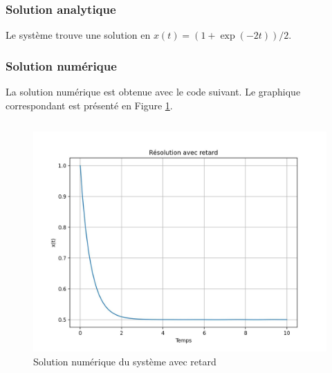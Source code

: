             \subsubsection{Solution analytique}
                Le système trouve une solution en $x(t) = (1 + \exp(-2t)) / 2$.
                
            \subsubsection{Solution numérique}
                La solution numérique est obtenue avec le code suivant. Le graphique correspondant est présenté en Figure \ref{fig:retard}.
                \inputminted{python}{codes/retard.py}
                \begin{figure}[ht!]
                    \centering
                    \includegraphics[width=\textwidth]{images/retard.jpg}
                    \caption{Solution numérique du système avec retard}
                    \label{fig:retard}
                \end{figure}

